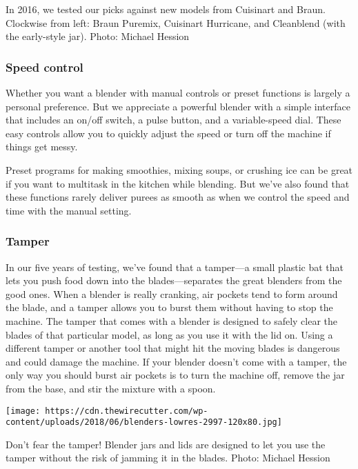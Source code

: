 In 2016, we tested our picks against new models from Cuisinart and
Braun. Clockwise from left: Braun Puremix, Cuisinart Hurricane, and
Cleanblend (with the early-style jar). Photo: Michael Hession

\hypertarget{speed-control}{%
\subsubsection{Speed control}\label{speed-control}}

Whether you want a blender with manual controls or preset functions is
largely a personal preference. But we appreciate a powerful blender with
a simple interface that includes an on/off switch, a pulse button, and a
variable-speed dial. These easy controls allow you to quickly adjust the
speed or turn off the machine if things get messy.

Preset programs for making smoothies, mixing soups, or crushing ice can
be great if you want to multitask in the kitchen while blending. But
we've also found that these functions rarely deliver purees as smooth as
when we control the speed and time with the manual setting.

\hypertarget{tamper}{%
\subsubsection{Tamper}\label{tamper}}

In our five years of testing, we've found that a tamper---a small
plastic bat that lets you push food down into the blades---separates the
great blenders from the good ones. When a blender is really cranking,
air pockets tend to form around the blade, and a tamper allows you to
burst them without having to stop the machine. The tamper that comes
with a blender is designed to safely clear the blades of that particular
model, as long as you use it with the lid on. Using a different tamper
or another tool that might hit the moving blades is dangerous and could
damage the machine. If your blender doesn't come with a tamper, the only
way you should burst air pockets is to turn the machine off, remove the
jar from the base, and stir the mixture with a spoon.

\texttt{[image: https://cdn.thewirecutter.com/wp-content/uploads/2018/06/blenders-lowres-2997-120x80.jpg]}

Don't fear the tamper! Blender jars and lids are designed to let you use
the tamper without the risk of jamming it in the blades. Photo: Michael
Hession

